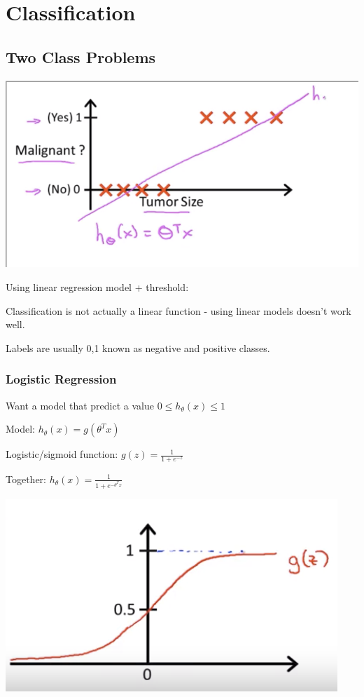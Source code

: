 \section{Classification}

\subsection{Two Class Problems}

\includegraphics{ml_figures/log_threshold.png}

Using linear regression model + threshold:

Classification is not actually a linear function - using linear models doesn't work well.

Labels are usually {0,1} known as negative and positive classes.

\subsubsection{Logistic Regression}

Want a model that predict a value $0\le h_\theta(x)\le 1$

Model: $h_\theta(x)=g(\theta^T x)$ 

Logistic/sigmoid function: $g(z) = \frac{1}{1+e^{-z}}$

Together: $h_\theta(x)=\frac{1}{1+e^{-\theta^T x}}$

\includegraphics{ml_figures/sigmoid.png}

